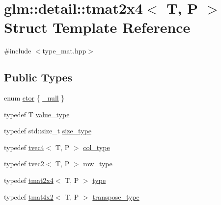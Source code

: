 \hypertarget{structglm_1_1detail_1_1tmat2x4}{}\section{glm\+:\+:detail\+:\+:tmat2x4$<$ T, P $>$ Struct Template Reference}
\label{structglm_1_1detail_1_1tmat2x4}


{\ttfamily \#include $<$type\+\_\+mat.\+hpp$>$}

\subsection*{Public Types}
\begin{DoxyCompactItemize}
\item 
enum \hyperlink{structglm_1_1detail_1_1tmat2x4_a3876cfcf80892580917b2b0417c22c24}{ctor} \{ \hyperlink{structglm_1_1detail_1_1tmat2x4_a3876cfcf80892580917b2b0417c22c24a1f9441d2e671b6cbcb17f580afb1b2b0}{\+\_\+null}
 \}
\item 
typedef T \hyperlink{structglm_1_1detail_1_1tmat2x4_a4c650fe9e8b18e4b41fc8f6b3c5e0fb7}{value\+\_\+type}
\item 
typedef std\+::size\+\_\+t \hyperlink{structglm_1_1detail_1_1tmat2x4_a93a0c2fd19243d8fa55a0c45a740794d}{size\+\_\+type}
\item 
typedef \hyperlink{structglm_1_1detail_1_1tvec4}{tvec4}$<$ T, P $>$ \hyperlink{structglm_1_1detail_1_1tmat2x4_a7324a2efc8a0f59f538568015bdda76b}{col\+\_\+type}
\item 
typedef \hyperlink{structglm_1_1detail_1_1tvec2}{tvec2}$<$ T, P $>$ \hyperlink{structglm_1_1detail_1_1tmat2x4_a3048033664c24f3c2bb2f326f32a0654}{row\+\_\+type}
\item 
typedef \hyperlink{structglm_1_1detail_1_1tmat2x4}{tmat2x4}$<$ T, P $>$ \hyperlink{structglm_1_1detail_1_1tmat2x4_a6e5bd72f58de7f3b40f3e9cf74df9b89}{type}
\item 
typedef \hyperlink{structglm_1_1detail_1_1tmat4x2}{tmat4x2}$<$ T, P $>$ \hyperlink{structglm_1_1detail_1_1tmat2x4_ad89bce74852aa9d53de6c2b780e7854f}{transpose\+\_\+type}
\end{DoxyCompactItemize}
